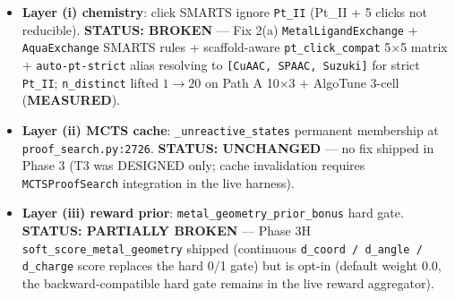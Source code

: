 \begin{enumerate}
  \begin{itemize}
    \item \textbf{Layer (i) chemistry}: click SMARTS ignore \texttt{Pt\_II} (Pt\_II + 5 clicks not reducible). \textbf{STATUS: BROKEN} --- Fix 2(a) \texttt{MetalLigandExchange} + \texttt{AquaExchange} SMARTS rules + scaffold-aware \texttt{pt\_click\_compat} 5$\times$5 matrix + \texttt{auto-pt-strict} alias resolving to \texttt{[CuAAC, SPAAC, Suzuki]} for strict \texttt{Pt\_II}; \texttt{n\_distinct} lifted $1 \to 20$ on Path A 10$\times$3 + AlgoTune 3-cell (\textbf{MEASURED}).
    \item \textbf{Layer (ii) MCTS cache}: \texttt{\_unreactive\_states} permanent membership at \texttt{proof\_search.py:2726}. \textbf{STATUS: UNCHANGED} --- no fix shipped in Phase 3 (T3 was DESIGNED only; cache invalidation requires \texttt{MCTSProofSearch} integration in the live harness).
    \item \textbf{Layer (iii) reward prior}: \texttt{metal\_geometry\_prior\_bonus} hard gate. \textbf{STATUS: PARTIALLY BROKEN} --- Phase 3H \texttt{soft\_score\_metal\_geometry} shipped (continuous \texttt{d\_coord / d\_angle / d\_charge} score replaces the hard 0/1 gate) but is opt-in (default weight $0.0$, the backward-compatible hard gate remains in the live reward aggregator).
  \end{itemize}


\end{enumerate}

